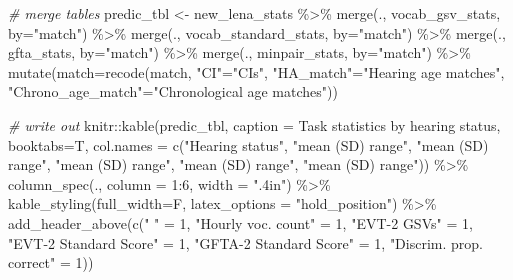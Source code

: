 \documentclass[
]{article}
\newenvironment{Shaded}{\begin{snugshade}}{\end{snugshade}}
\newcommand{\AttributeTok}[1]{\textcolor[rgb]{0.77,0.63,0.00}{#1}}
\newcommand{\CommentTok}[1]{\textcolor[rgb]{0.56,0.35,0.01}{\textit{#1}}}
\newcommand{\DecValTok}[1]{\textcolor[rgb]{0.00,0.00,0.81}{#1}}
\newcommand{\FunctionTok}[1]{\textcolor[rgb]{0.00,0.00,0.00}{#1}}
\newcommand{\NormalTok}[1]{#1}
\newcommand{\OtherTok}[1]{\textcolor[rgb]{0.56,0.35,0.01}{#1}}
\newcommand{\SpecialCharTok}[1]{\textcolor[rgb]{0.00,0.00,0.00}{#1}}
\newcommand{\StringTok}[1]{\textcolor[rgb]{0.31,0.60,0.02}{#1}}
\begin{document}
\begin{Shaded}
\begin{Highlighting}[]
\CommentTok{\# merge tables}
\NormalTok{predic\_tbl }\OtherTok{\textless{}{-}}\NormalTok{ new\_lena\_stats }\SpecialCharTok{\%\textgreater{}\%} 
  \FunctionTok{merge}\NormalTok{(., vocab\_gsv\_stats, }\AttributeTok{by=}\StringTok{"match"}\NormalTok{) }\SpecialCharTok{\%\textgreater{}\%}
  \FunctionTok{merge}\NormalTok{(., vocab\_standard\_stats, }\AttributeTok{by=}\StringTok{"match"}\NormalTok{) }\SpecialCharTok{\%\textgreater{}\%}
  \FunctionTok{merge}\NormalTok{(., gfta\_stats, }\AttributeTok{by=}\StringTok{"match"}\NormalTok{) }\SpecialCharTok{\%\textgreater{}\%}
  \FunctionTok{merge}\NormalTok{(., minpair\_stats, }\AttributeTok{by=}\StringTok{"match"}\NormalTok{) }\SpecialCharTok{\%\textgreater{}\%}
  \FunctionTok{mutate}\NormalTok{(}\AttributeTok{match=}\FunctionTok{recode}\NormalTok{(match, }\StringTok{"CI"}\OtherTok{=}\StringTok{"CIs"}\NormalTok{, }\StringTok{"HA\_match"}\OtherTok{=}\StringTok{"Hearing age matches"}\NormalTok{, }\StringTok{"Chrono\_age\_match"}\OtherTok{=}\StringTok{"Chronological age matches"}\NormalTok{))}
\end{Highlighting}
\end{Shaded}

\begin{Shaded}
\begin{Highlighting}[]
\CommentTok{\# write out}
\NormalTok{knitr}\SpecialCharTok{::}\FunctionTok{kable}\NormalTok{(predic\_tbl, }\AttributeTok{caption =} \StringTok{\textquotesingle{}Task statistics by hearing status\textquotesingle{}}\NormalTok{, }
             \AttributeTok{booktabs=}\NormalTok{T,}
             \AttributeTok{col.names =} \FunctionTok{c}\NormalTok{(}\StringTok{"Hearing status"}\NormalTok{, }\StringTok{"mean (SD) range"}\NormalTok{, }\StringTok{"mean (SD) range"}\NormalTok{,  }\StringTok{"mean (SD) range"}\NormalTok{, }\StringTok{"mean (SD) range"}\NormalTok{, }\StringTok{"mean (SD) range"}\NormalTok{)) }\SpecialCharTok{\%\textgreater{}\%} 
   \FunctionTok{column\_spec}\NormalTok{(., }\AttributeTok{column =} \DecValTok{1}\SpecialCharTok{:}\DecValTok{6}\NormalTok{, }\AttributeTok{width =} \StringTok{".4in"}\NormalTok{) }\SpecialCharTok{\%\textgreater{}\%}
  \FunctionTok{kable\_styling}\NormalTok{(}\AttributeTok{full\_width=}\NormalTok{F, }
                \AttributeTok{latex\_options =} \StringTok{"hold\_position"}\NormalTok{) }\SpecialCharTok{\%\textgreater{}\%}
  \FunctionTok{add\_header\_above}\NormalTok{(}\FunctionTok{c}\NormalTok{(}\StringTok{" "} \OtherTok{=} \DecValTok{1}\NormalTok{, }
                     \StringTok{"Hourly voc. count"} \OtherTok{=} \DecValTok{1}\NormalTok{, }
                     \StringTok{"EVT{-}2 GSVs"} \OtherTok{=} \DecValTok{1}\NormalTok{, }
                     \StringTok{"EVT{-}2 Standard Score"} \OtherTok{=} \DecValTok{1}\NormalTok{, }
                     \StringTok{"GFTA{-}2 Standard Score"} \OtherTok{=} \DecValTok{1}\NormalTok{, }
                     \StringTok{"Discrim. prop. correct"} \OtherTok{=} \DecValTok{1}\NormalTok{))}
\end{Highlighting}
\end{Shaded}
\end{document}
